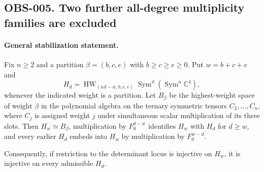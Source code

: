 \subsection{OBS-005. Two further all-degree multiplicity families are excluded}

\paragraph{General stabilization statement.}
Fix $n\ge2$ and a partition $\beta=(b,c,e)$ with $b\ge c\ge e\ge0$.
Put $w=b+c+e$ and
\[
 H_d=\operatorname{HW}_{(nd-w,b,c,e)}
        \operatorname{Sym}^d(\operatorname{Sym}^n\mathbb C^4),
\]
whenever the indicated weight is a partition. Let $B_\beta$ be the
highest-weight space of weight $\beta$ in the polynomial algebra on
the ternary symmetric tensors $C_2,\ldots,C_n$, where $C_j$ is assigned
weight $j$ under simultaneous scalar multiplication of its three slots.
Then $H_w\simeq B_\beta$, multiplication by $F_0^{d-w}$ identifies
$H_w$ with $H_d$ for $d\ge w$, and every earlier $H_d$ embeds into
$H_w$ by multiplication by $F_0^{w-d}$.

Consequently, if restriction to the determinant locus is injective on
$H_w$, it is injective on every admissible $H_d$.

